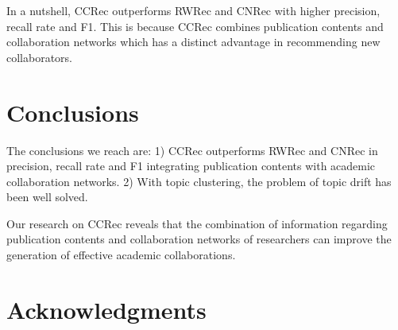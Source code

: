 \documentclass{acm_proc_article-sp}
\begin{document}
In a nutshell, CCRec outperforms RWRec and CNRec with higher precision, recall rate and F1. This is because CCRec combines publication contents and collaboration networks which has a distinct advantage in recommending new collaborators.

\section{Conclusions}
The conclusions we reach are: 1) CCRec outperforms RWRec and CNRec in precision, recall rate and F1 integrating publication contents with academic collaboration networks. 2) With topic clustering, the problem of topic drift has been well solved.

Our research on CCRec reveals that the combination of information regarding publication contents and collaboration networks of researchers can improve the generation of effective academic collaborations.

\section{Acknowledgments}



\balancecolumns
\end{document}
